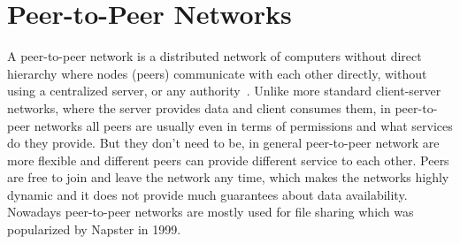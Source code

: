 \section{Peer-to-Peer Networks}
\label{sec:peer-to-peer-networks}
A peer-to-peer network is a distributed network of computers without direct hierarchy where nodes (peers) communicate with each other directly, without using a centralized server, or any authority~\cite{schollmeier}.
Unlike more standard client-server networks, where the server provides data and client consumes them, in peer-to-peer networks all peers are usually even in terms of permissions and what services do they provide.
But they don't need to be, in general peer-to-peer network are more flexible and different peers can provide different service to each other.
Peers are free to join and leave the network any time, which makes the networks highly dynamic and it does not provide much guarantees about data availability.
Nowadays peer-to-peer networks are mostly used for file sharing which was popularized by Napster in 1999\cite{saroiu}.